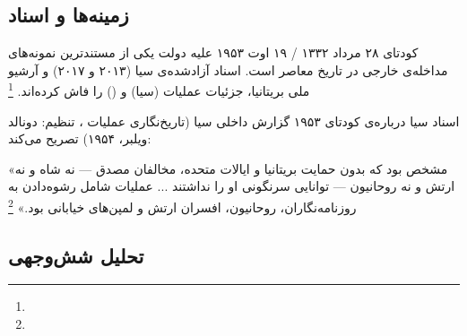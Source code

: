 \subsection{زمینه‌ها و اسناد}
\label{subsec:ch07-coup-background}

کودتای ۲۸ مرداد ۱۳۳۲ / ۱۹ اوت ۱۹۵۳ علیه دولت  یکی از مستندترین نمونه‌های مداخله‌ی خارجی در تاریخ معاصر است. اسناد آزادشده‌ی سیا (۲۰۱۳ و ۲۰۱۷) و آرشیو ملی بریتانیا، جزئیات عملیات  (سیا) و  () را فاش کرده‌اند.%
\footnote{}

\begin{legalNote}{اسناد سیا درباره‌ی کودتای ۱۹۵۳}
گزارش داخلی سیا (تاریخ‌نگاری عملیات ، تنظیم: دونالد ویلبر، ۱۹۵۴) تصریح می‌کند:

«مشخص بود که بدون حمایت بریتانیا و ایالات متحده، مخالفان مصدق — نه شاه و نه ارتش و نه روحانیون — توانایی سرنگونی او را نداشتند ... عملیات شامل رشوه‌دادن به روزنامه‌نگاران، روحانیون، افسران ارتش و لمپن‌های خیابانی بود.»%
\footnote{}
\end{legalNote}

\subsection{تحلیل شش‌وجهی}
\label{subsec:ch07-coup-analysis}

